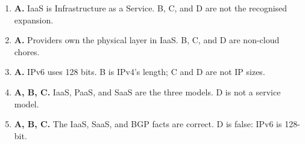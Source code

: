 \documentclass[11pt]{article}
\begin{document}
\begin{enumerate}[label=\textbf{Q\arabic*.}, leftmargin=*]
\item \textbf{A.} IaaS is Infrastructure as a Service. B, C, and D are not the recognised expansion.
\item \textbf{A.} Providers own the physical layer in IaaS. B, C, and D are non-cloud chores.
\item \textbf{A.} IPv6 uses 128 bits. B is IPv4's length; C and D are not IP sizes.
\item \textbf{A, B, C.} IaaS, PaaS, and SaaS are the three models. D is not a service model.
\item \textbf{A, B, C.} The IaaS, SaaS, and BGP facts are correct. D is false: IPv6 is 128-bit.
\end{enumerate}
\def\JKSSBLessonID{62}\def\JKSSBAnswers{1}
\end{document}
